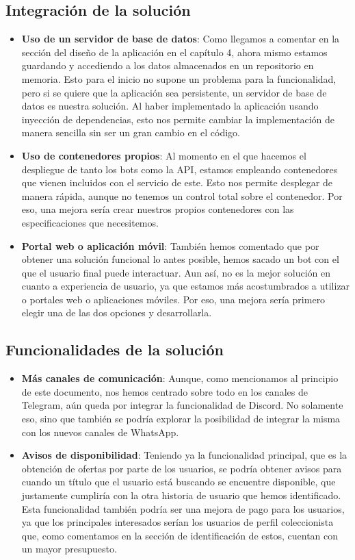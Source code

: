 \subsection{Integración de la solución}
\begin{itemize}
    \item \textbf{Uso de un servidor de base de datos}: Como llegamos a comentar en 
    la sección del diseño de la aplicación en el capítulo 4, ahora mismo estamos 
    guardando y accediendo a los datos almacenados en un repositorio en memoria. 
    Esto para el inicio no supone un problema para la funcionalidad, pero si se 
    quiere que la aplicación sea persistente, un servidor de base de datos es 
    nuestra solución. Al haber implementado la aplicación usando inyección de 
    dependencias, esto nos permite cambiar la implementación de manera sencilla sin 
    ser un gran cambio en el código.
    \item \textbf{Uso de contenedores propios}: Al momento en el que hacemos el 
    despliegue de tanto los bots como la API, estamos empleando contenedores que 
    vienen incluidos con el servicio de este. Esto nos permite desplegar de manera 
    rápida, aunque no tenemos un control total sobre el contenedor. Por eso, una 
    mejora sería crear nuestros propios contenedores con las especificaciones que 
    necesitemos.
    \item \textbf{Portal web o aplicación móvil}: También hemos comentado que por 
    obtener una solución funcional lo antes posible, hemos sacado un bot con el que 
    el usuario final puede interactuar. Aun así, no es la mejor solución en cuanto 
    a experiencia de usuario, ya que estamos más acostumbrados a utilizar o 
    portales web o aplicaciones móviles. Por eso, una mejora sería primero elegir 
    una de las dos opciones y desarrollarla.
\end{itemize}

\subsection{Funcionalidades de la solución}
\begin{itemize}
    \item \textbf{Más canales de comunicación}: Aunque, como mencionamos al 
    principio de este documento, nos hemos centrado sobre todo en los canales de 
    Telegram, aún queda por integrar la funcionalidad de Discord. No solamente eso, 
    sino que también se podría explorar la posibilidad de integrar la misma con 
    los nuevos canales de WhatsApp.
    \item \textbf{Avisos de disponibilidad}: Teniendo ya la funcionalidad 
    principal, que es la obtención de ofertas por parte de los usuarios, se podría 
    obtener avisos para cuando un título que el usuario está buscando se encuentre 
    disponible, que justamente cumpliría con la otra historia de usuario que hemos 
    identificado. Esta funcionalidad también podría ser una mejora de pago para los 
    usuarios, ya que los principales interesados serían los usuarios de perfil 
    coleccionista que, como comentamos en la sección de identificación de estos, 
    cuentan con un mayor presupuesto.
\end{itemize}